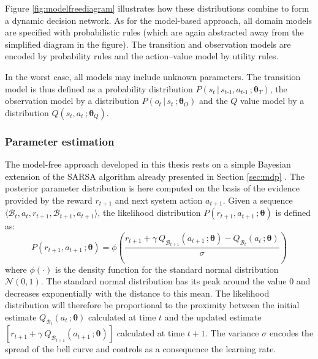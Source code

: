 Figure \ref{fig:modelfreediagram} illustrates how these distributions combine to form a dynamic decision network. As for the model-based approach, all domain models are specified with probabilistic rules (which are again abstracted away from the simplified diagram in the figure). The transition and observation models are encoded by probability rules and the action--value model by utility rules. 

In the worst case, all models may include unknown parameters.  The transition model is thus defined as a probability distribution $P(s_t \, | \, s_{t\mbox{-}1}, a_{t\mbox{-}1} \,; \boldsymbol\theta_T)$, the observation model by a distribution $P(o_t \, | \, s_t\,; \boldsymbol\theta_O)$ and the $Q$ value model by a distribution $Q(s_t,a_t\,; \boldsymbol\theta_Q)$.  

\subsubsection*{Parameter estimation}


The model-free approach developed in this thesis rests on a simple Bayesian extension of the SARSA algorithm already presented in Section \ref{sec:mdp} .  The posterior parameter distribution is here computed on the basis of the evidence provided by the reward $r_{t+1}$ and next system action $a_{t+1}$.  Given a sequence $\langle \mathcal{B}_t, a_t, r_{t+1}, \mathcal{B}_{t+1}, a_{t+1} \rangle$, the likelihood distribution $P(r_{t+1}, a_{t+1} \,; \boldsymbol\theta)$ is defined as:
\begin{equation}
P(r_{t+1}, a_{t+1} \,; \boldsymbol\theta) = \phi \left(\frac{r_{t+1} + \gamma \ Q_{\mathcal{B}_{t+1}} \left(a_{t+1} \,; \boldsymbol\theta\right) - Q_{\mathcal{B}_t}\left(a_t \,; \boldsymbol\theta\right)}{\sigma} \right) \label{eq:modelfreelikelihood}
\end{equation}
where $\phi(\cdot)$ is the density function for the standard normal distribution $\mathcal{N}(0, 1)$. The standard normal distribution has its peak around the value 0 and decreases exponentially with the distance to this mean. The likelihood distribution will therefore  be proportional to the proximity between the initial estimate 
$Q_{\mathcal{B}_t}(a_t \,; \boldsymbol\theta)$ calculated at time $t$ and the updated estimate $\left[r_{t+1} + \gamma \ Q_{\mathcal{B}_{t+1}} (a_{t+1} \,; \boldsymbol\theta) \right]$ calculated at time $t+1$. The variance $\sigma$ encodes the spread of the bell curve and controls as a consequence the learning rate.

